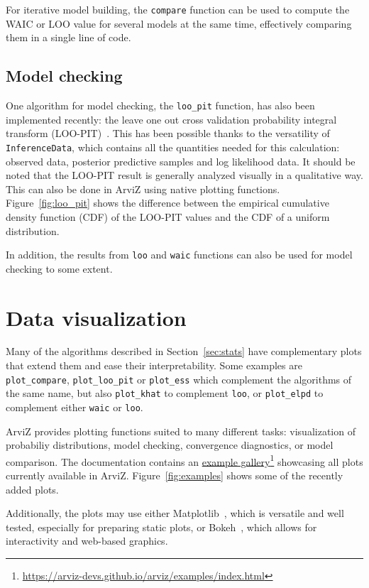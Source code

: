 \documentclass[anonymous=false, %
               format=acmsmall, %
               review=true, %
               screen=true, %
               nonacm=true]{acmart}
\begin{document}
For iterative model building, the \texttt{compare} function can be used
to compute the WAIC or LOO value for several
models at the same time, effectively comparing them in a single line of code.

\subsection{Model checking}
One algorithm for model checking, the \texttt{loo\_pit} function, has also been implemented
recently: the leave
one out cross validation probability integral transform
(LOO-PIT)~\cite{gabry2019visualization}. This has been possible thanks to the
versatility of \texttt{InferenceData}, which contains all the quantities
needed for this calculation: observed data, posterior predictive samples and
log likelihood data. It should be noted that the LOO-PIT result is generally
analyzed visually in a qualitative way. This can also be done in ArviZ using
native plotting functions. Figure~\ref{fig:loo_pit} shows the difference
between the empirical cumulative density function (CDF) of the LOO-PIT values
and the CDF of a uniform distribution.

In addition, the results from \texttt{loo} and
\texttt{waic} functions can also be used for model checking to some extent.

\section{Data visualization}\label{sec:plots}
Many of the algorithms described in Section~\ref{sec:stats} have complementary
plots that extend them and ease their interpretability. Some
examples are \texttt{plot\_compare}, \texttt{plot\_loo\_pit} or
\texttt{plot\_ess} which complement the algorithms of the same name, but
also \texttt{plot\_khat} to complement \texttt{loo}, or
\texttt{plot\_elpd} to complement either \texttt{waic} or
\texttt{loo}.

ArviZ provides plotting functions suited to many different tasks:
visualization of probabiliy distributions, model checking, convergence
diagnostics, or model comparison. The
documentation contains an
\href{https://arviz-devs.github.io/arviz/examples/index.html}{example
gallery}\footnote{\url{https://arviz-devs.github.io/arviz/examples/index.html}}
showcasing all plots currently available in ArviZ. Figure~\ref{fig:examples}
shows some of the recently added plots.

Additionally, the plots may use either Matplotlib~\cite{Hunter2007matplotlib},
which is versatile and well
tested, especially for preparing static plots, or Bokeh~\cite{bokeh}, which allows for
interactivity and web-based graphics.
\end{document}

